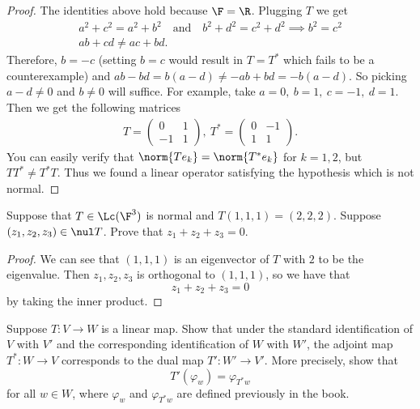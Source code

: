 \documentclass{extarticle}
\begin{document}
\begin{proof}
    The identities above hold because \( \F=\R \).
    Plugging \( T \) we get
    \begin{gather*}
        a^2 + c^2 = a^2 + b^2 \quad \text{and} \quad  b^2 + d^2 = c^2 + d^2
        \implies b^2 = c^2 \\
        ab + cd \ne ac + bd.
    \end{gather*}
    Therefore, \( b = -c \) (setting \( b = c \) would result in \(T = T^*\) which fails to be a counterexample)
    and \( ab - bd = b(a-d) \ne -ab + bd = -b(a-d) \). So picking \( a - d \ne 0 \) and \( b \ne 0\)
    will suffice.
    For example, take \( a = 0, \ b = 1, \ c = -1, \ d = 1 \). Then we get the following
    matrices
    \begin{align*}
        T =
        \begin{pmatrix}
            0 & 1 \\
            -1 & 1
        \end{pmatrix}, \
        T^* =
        \begin{pmatrix}
            0 & -1 \\
            1 & 1
        \end{pmatrix}.
    \end{align*}
    You can easily verify that \(\norm{T e_k} = \norm{T^* e_k}\) for \( k=1, 2 \), but
    $ T T^* \ne T^* T$. Thus we found a linear operator satisfying the hypothesis which is not normal.
\end{proof}

\begin{problem}{30}
    Suppose that \(T \in \Lc(\F^3)\) is normal and \(T(1, 1 ,1) = (2, 2, 2)\). Suppose
    \((z_1, z_2, z_3) \in \nul T\). Prove that \(z_1 + z_2 + z_3 = 0\).
\end{problem}

\begin{proof}
We can see that \((1,1,1)\) is an eigenvector of \(T\) with \(2\) to be the eigenvalue. Then
\(z_1, z_2, z_3\) is orthogonal to \((1,1,1)\), so we have that
\[z_1 + z_2 + z_3 = 0\]
by taking the inner product.
\end{proof}

\begin{problem}{32}
    Suppose \(T \colon V \to W\) is a linear map. Show that under the standard identification of
    \(V\) with \(V'\) and the corresponding identification of \(W\) with \(W'\), the adjoint map
    \(T^* \colon W \to V\) corresponds to the dual map \(T' \colon W' \to V'\). More precisely, show
    that
    \[T'(\varphi_w) = \varphi_{T^* w}\]
    for all \(w \in W\), where \(\varphi_w\) and \(\varphi_{T^* w}\) are defined previously in the
    book.
\end{problem}
\end{document}
